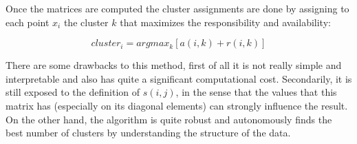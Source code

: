 Once the matrices are computed the cluster assignments are done by assigning to each point $x_i$ the cluster $k$ that maximizes the responsibility and availability:

\begin{equation} \label{similarity_matrix}
cluster_i = argmax_{k} \left[a(i,k)+r(i,k)	\right]
\end{equation}

There are some drawbacks to this method, first of all it is not really simple and interpretable and also has quite a significant computational cost. Secondarily, it is still exposed to the definition of $s(i,j)$, in the sense that the values that this matrix has (especially on its diagonal elements) can strongly influence the result.\\
On the other hand, the algorithm is quite robust and autonomously finds the best number of clusters by understanding the structure of the data.